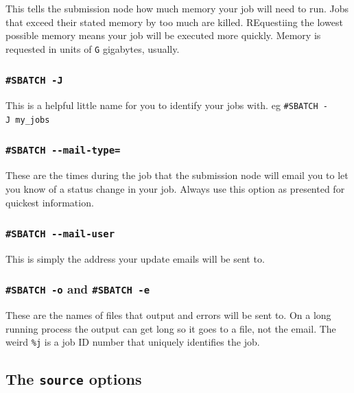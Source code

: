 \documentclass[]{book}
\begin{document}
This tells the submission node how much memory your job will need to run. Jobs that exceed their stated memory by too much are killed. REquestiing the lowest possible memory means your job will be executed more quickly. Memory is requested in units of \texttt{G} gigabytes, usually.

\hypertarget{sbatch--j}{%
\subsubsection{\texorpdfstring{\texttt{\#SBATCH\ -J}}{\#SBATCH -J}}\label{sbatch--j}}

This is a helpful little name for you to identify your jobs with. eg \texttt{\#SBATCH\ -J\ my\_jobs}

\hypertarget{sbatch---mail-type}{%
\subsubsection{\texorpdfstring{\texttt{\#SBATCH\ -\/-mail-type=}}{\#SBATCH -\/-mail-type=}}\label{sbatch---mail-type}}

These are the times during the job that the submission node will email you to let you know of a status change in your job. Always use this option as presented for quickest information.

\hypertarget{sbatch---mail-user}{%
\subsubsection{\texorpdfstring{\texttt{\#SBATCH\ -\/-mail-user}}{\#SBATCH -\/-mail-user}}\label{sbatch---mail-user}}

This is simply the address your update emails will be sent to.

\hypertarget{sbatch--o-and-sbatch--e}{%
\subsubsection{\texorpdfstring{\texttt{\#SBATCH\ -o} and \texttt{\#SBATCH\ -e}}{\#SBATCH -o and \#SBATCH -e}}\label{sbatch--o-and-sbatch--e}}

These are the names of files that output and errors will be sent to. On a long running process the output can get long so it goes to a file, not the email. The weird \texttt{\%j} is a job ID number that uniquely identifies the job.

\hypertarget{the-source-options}{%
\subsection{\texorpdfstring{The \texttt{source} options}{The source options}}\label{the-source-options}}
\end{document}
